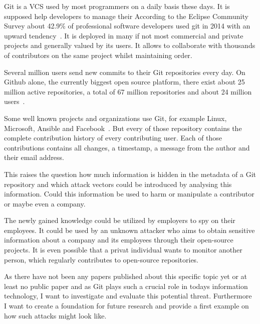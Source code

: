 Git is a \ac{VCS} used by most programmers on a daily basis these days.
It is supposed help developers to manage their
According to the Eclipse Community Survey about 42.9\% of professional software developers used git in 2014 with an upward tendency~\cite{article:git-popularity}.
It is deployed in many if not most commercial and private projects and generally valued by its users.
It allows to collaborate with thousands of contributors on the same project whilst maintaining order.

Several million users send new commits to their Git repositories every day.
On Github alone, the currently biggest open source platform, there exist about 25 million active repositories, a total of 67 million repositories and about 24 million users~\cite{article:github-statistics}.

Some well known projects and organizations use Git, for example Linux, Microsoft, Ansible and Facebook~\cite{article:github-statistics}.
But every of those repository contains the complete contribution history of every contributing user.
Each of those contributions contains all changes, a timestamp, a message from the author and their email address.

This raises the question how much information is hidden in the metadata of a Git repository and which attack vectors could be introduced by analysing this information.
Could this information be used to harm or manipulate a contributor or maybe even a company.

The newly gained knowledge could be utilized by employers to spy on their employees.
It could be used by an unknown attacker who aims to obtain sensitive information about a company and its employees through their open-source projects.
It is even possible that a privat individual wants to monitor another person, which regularly contributes to open-source repositories.

As there have not been any papers published about this specific topic yet or at least no public paper and as Git plays such a crucial role in todays information technology, I want to investigate and evaluate this potential threat.
Furthermore I want to create a foundation for future research and provide a first example on how such attacks might look like.
